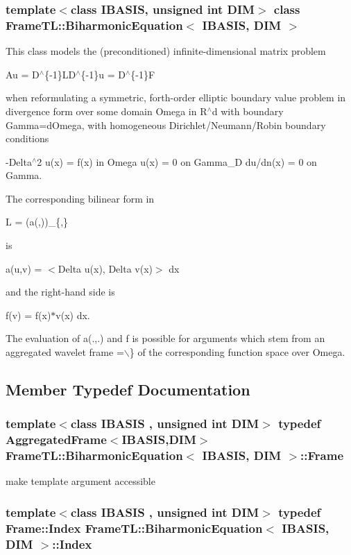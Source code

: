 \subsubsection*{template$<$class IBASIS, unsigned int DIM$>$ class FrameTL::BiharmonicEquation$<$ IBASIS, DIM $>$}

This class models the (preconditioned) infinite-dimensional matrix problem

Au = D$^\wedge$\{-1\}LD$^\wedge$\{-1\}u = D$^\wedge$\{-1\}F

when reformulating a symmetric, forth-order elliptic boundary value problem in divergence form over some domain Omega in R$^\wedge$d with boundary Gamma=dOmega, with homogeneous Dirichlet/Neumann/Robin boundary conditions

-Delta$^\wedge$2 u(x) = f(x) in Omega u(x) = 0 on Gamma\_\-D du/dn(x) = 0 on Gamma.

The corresponding bilinear form in

L = (a(,))\_\-\{,\}

is

a(u,v) =  $<$Delta u(x), Delta v(x)$>$ dx

and the right-hand side is

f(v) =  f(x)$\ast$v(x) dx.

The evaluation of a(.,.) and f is possible for arguments  which stem from an aggregated wavelet frame =$\backslash$\} of the corresponding function space over Omega. 

\subsection{Member Typedef Documentation}
\hypertarget{classFrameTL_1_1BiharmonicEquation_a6589dcf7cfc46ba411c3f35146e1a5d}{
\subsubsection[{Frame}]{\setlength{\rightskip}{0pt plus 5cm}template$<$class IBASIS , unsigned int DIM$>$ {\bf typedef} {\bf AggregatedFrame}$<$IBASIS,DIM$>$ {\bf FrameTL::BiharmonicEquation}$<$ IBASIS, DIM $>$::{\bf Frame}}}
\label{classFrameTL_1_1BiharmonicEquation_a6589dcf7cfc46ba411c3f35146e1a5d}


make template argument accessible \hypertarget{classFrameTL_1_1BiharmonicEquation_3092eb11291bea911cf17d1de560bc1e}{
\subsubsection[{Index}]{\setlength{\rightskip}{0pt plus 5cm}template$<$class IBASIS , unsigned int DIM$>$ {\bf typedef} {\bf Frame::Index} {\bf FrameTL::BiharmonicEquation}$<$ IBASIS, DIM $>$::{\bf Index}}}
\label{classFrameTL_1_1BiharmonicEquation_3092eb11291bea911cf17d1de560bc1e}


